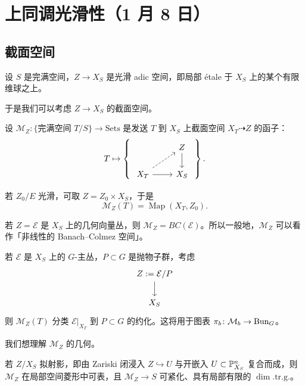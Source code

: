 \section[上同调光滑性]{上同调光滑性（1 月 8 日）}


\subsection{截面空间}

设 $S$ 是完满空间，$Z\to X_S$ 是光滑 adic 空间，即局部 étale 于 $X_S$ 上的某个有限维球之上。

于是我们可以考虑 $Z\to X_S$ 的截面空间。

\begin{definition}
设 $\mathcal{M}_Z\colon\{\text{完满空间 }T/S\}\to\mathrm{Sets}$ 是发送 $T$ 到 $X_S$ 上截面空间 $X_T\dashrightarrow Z$ 的函子：
\[
T\mapsto\left\{\ \begin{tikzcd}
& Z \arrow[d] \\
X_T \arrow[ur, dashed] \arrow[r] & X_S
\end{tikzcd}\ \right\}.
\]
\end{definition}

\begin{example}
若 $Z_0/E$ 光滑，可取 $Z=Z_0\times X_S$，于是
\[
\mathcal{M}_Z(T)=\operatorname{Map}(X_T,Z_0).
\]
\end{example}

\begin{example}
若 $Z=\mathcal{E}$ 是 $X_S$ 上的几何向量丛，则 $\mathcal{M}_Z=BC(\mathcal{E})$。所以一般地，$\mathcal{M}_Z$ 可以看作「非线性的 Banach--Colmez 空间」。
\end{example}

\begin{example}
若 $\mathcal{E}$ 是 $X_S$ 上的 $G$-主丛，$P\subset G$ 是抛物子群，考虑
\[
\begin{tikzcd}
Z:=\mathcal{E}/P \arrow[d] \\
X_S
\end{tikzcd}
\]
则 $\mathcal{M}_Z(T)$ 分类 $\mathcal{E}|_{X_T}$ 到 $P\subset G$ 的约化。这将用于图表 $\pi_b\colon\mathcal{M}_b\to\mathrm{Bun}_G$。
\end{example}

我们想理解 $\mathcal{M}_Z$ 的几何。

\begin{proposition}
若 $Z/X_S$ 拟射影，即由 Zariski 闭浸入 $Z\hookrightarrow U$ 与开嵌入 $U\subset\mathbb{P}^n_{X_S}$ 复合而成，则 $\mathcal{M}_Z$ 在局部空间菱形中可表，且 $\mathcal{M}_Z\to S$ 可紧化、具有局部有限的 $\dim.\mathrm{tr.g.}$。
\end{proposition}

